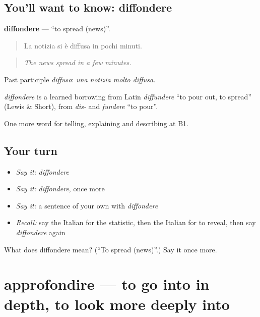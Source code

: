 \subsection*{You'll want to know: diffondere}
\textbf{diffondere} — \textquotedblleft{}to spread (news)\textquotedblright{}.

\begin{quote}
La notizia si è diffusa in pochi minuti.
\end{quote}

\begin{quote}
\emph{The news spread in a few minutes.}
\end{quote}

Past participle \emph{diffuso}: \emph{una notizia molto diffusa}.

\begin{cousinweb}
\emph{diffondere} is a learned borrowing from Latin \emph{diffundere} \textquotedblleft{}to pour out, to spread\textquotedblright{} (Lewis \& Short), from \emph{dis-} and \emph{fundere} \textquotedblleft{}to pour\textquotedblright{}.
\end{cousinweb}

\begin{grammarlens}[title={What you've built}]
One more word for telling, explaining and describing at B1.
\end{grammarlens}

\subsection*{Your turn}
\begin{itemize}
\raggedright
  \item \emph{Say it:} \emph{diffondere}
  \item \emph{Say it:} \emph{diffondere}, once more
  \item \emph{Say it:} a sentence of your own with \emph{diffondere}
  \item \emph{Recall:} say the Italian for the statistic, then the Italian for to reveal, then say \emph{diffondere} again
\end{itemize}

\begin{tcolorbox}[breakable,colback=teal!4,colframe=teal!35!black,title={Before you move on}]
What does diffondere mean? (\textquotedblleft{}To spread (news)\textquotedblright{}.) Say it once more.
\end{tcolorbox}
\section[approfondire]{approfondire — to go into in depth, to look more deeply into}

